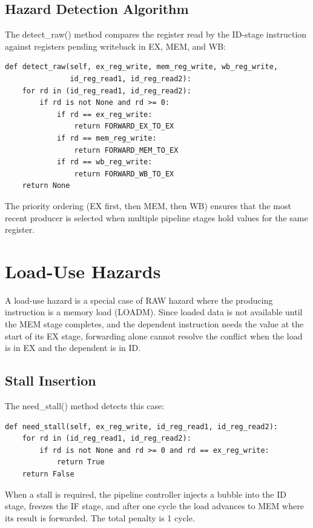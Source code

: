 \documentclass[12pt,a4paper,twoside]{book}
\theoremstyle{trinarytheorem}
\theoremstyle{trinarydefinition}
\newcommand{\code}[1]{\textsf{#1}}
\begin{document}
\subsection{Hazard Detection Algorithm}

The \code{detect\_raw()} method compares the register read by the
ID-stage instruction against registers pending writeback in EX, MEM, and
WB:

\begin{verbatim}
def detect_raw(self, ex_reg_write, mem_reg_write, wb_reg_write,
               id_reg_read1, id_reg_read2):
    for rd in (id_reg_read1, id_reg_read2):
        if rd is not None and rd >= 0:
            if rd == ex_reg_write:
                return FORWARD_EX_TO_EX
            if rd == mem_reg_write:
                return FORWARD_MEM_TO_EX
            if rd == wb_reg_write:
                return FORWARD_WB_TO_EX
    return None
\end{verbatim}

The priority ordering (EX first, then MEM, then WB) ensures that the
most recent producer is selected when multiple pipeline stages hold
values for the same register.

\section{Load-Use Hazards}

A load-use hazard is a special case of RAW hazard where the producing
instruction is a memory load (LOADM). Since loaded data is not available
until the MEM stage completes, and the dependent instruction needs the
value at the start of its EX stage, forwarding alone cannot resolve
the conflict when the load is in EX and the dependent is in ID.

\subsection{Stall Insertion}

The \code{need\_stall()} method detects this case:

\begin{verbatim}
def need_stall(self, ex_reg_write, id_reg_read1, id_reg_read2):
    for rd in (id_reg_read1, id_reg_read2):
        if rd is not None and rd >= 0 and rd == ex_reg_write:
            return True
    return False
\end{verbatim}

When a stall is required, the pipeline controller injects a bubble into
the ID stage, freezes the IF stage, and after one cycle the load advances
to MEM where its result is forwarded. The total penalty is 1 cycle.
\end{document}

